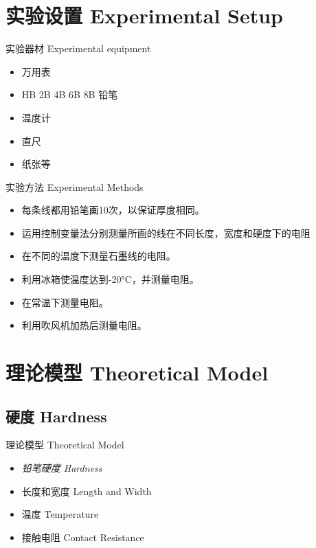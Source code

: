 \documentclass[10pt]{beamer}
\begin{document}
\section[Experimental Setup]{实验设置 Experimental Setup}
\begin{frame}{实验器材 Experimental equipment}
	 \begin{itemize}
	 	\item 万用表
	 	\item HB 2B 4B 6B 8B 铅笔
	 	\item 温度计
	 	\item 直尺
	 	\item 纸张等
	 \end{itemize}
\end{frame}


\begin{frame}{实验方法 Experimental Methods}
	\begin{itemize}
	\item 每条线都用铅笔画10次，以保证厚度相同。
	\item 运用控制变量法分别测量所画的线在不同长度，宽度和硬度下的电阻\bigskip
	\item 在不同的温度下测量石墨线的电阻。
	\item 利用冰箱使温度达到-20°C，并测量电阻。
	\item 在常温下测量电阻。
	\item 利用吹风机加热后测量电阻。
	\end{itemize}
\end{frame}


\section[Theoretical Model]{理论模型 Theoretical Model}
\subsection{硬度 Hardness}


\begin{frame}{理论模型 Theoretical Model}
\begin{itemize}
		\item {\LARGE \textit{铅笔硬度 Hardness}}
	\item 长度和宽度 Length and Width

	\item 温度 Temperature
			\item 接触电阻 Contact Resistance
\end{itemize}
\end{frame}
\end{document}
